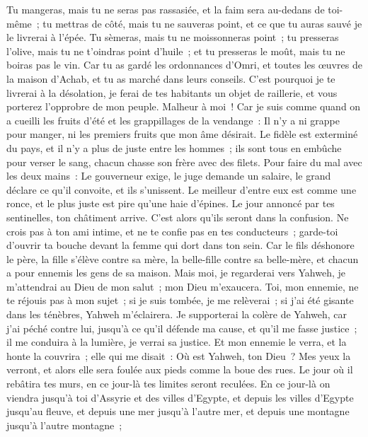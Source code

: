 \begin{multicols}{2}
Tu mangeras, mais tu ne seras pas rassasiée, et la faim sera au-dedans de toi-même~; tu mettras de côté, mais tu ne sauveras point, et ce que tu auras sauvé je le livrerai à l'épée.
Tu sèmeras, mais tu ne moissonneras point~; tu presseras l'olive, mais tu ne t'oindras point d'huile~; et tu presseras le moût, mais tu ne boiras pas le vin.
Car tu as gardé les ordonnances d'Omri, et toutes les œuvres de la maison d'Achab, et tu as marché dans leurs conseils. C'est pourquoi je te livrerai à la désolation, je ferai de tes habitants un objet de raillerie, et vous porterez l'opprobre de mon peuple.
\VerseOne{}Malheur à moi~! Car je suis comme quand on a cueilli les fruits d'été et les grappillages de la vendange~: Il n'y a ni grappe pour manger, ni les premiers fruits que mon âme désirait.
Le fidèle est exterminé du pays, et il n'y a plus de juste entre les hommes~; ils sont tous en embûche pour verser le sang, chacun chasse son frère avec des filets.
Pour faire du mal avec les deux mains~: Le gouverneur exige, le juge demande un salaire, le grand déclare ce qu'il convoite, et ils s'unissent.
Le meilleur d'entre eux est comme une ronce, et le plus juste est pire qu'une haie d'épines. Le jour annoncé par tes sentinelles, ton châtiment arrive. C'est alors qu'ils seront dans la confusion.
Ne crois pas à ton ami intime, et ne te confie pas en tes conducteurs~; garde-toi d'ouvrir ta bouche devant la femme qui dort dans ton sein.
Car le fils déshonore le père, la fille s'élève contre sa mère, la belle-fille contre sa belle-mère, et chacun a pour ennemis les gens de sa maison.
Mais moi, je regarderai vers Yahweh, je m'attendrai au Dieu de mon salut~; mon Dieu m'exaucera.
Toi, mon ennemie, ne te réjouis pas à mon sujet~; si je suis tombée, je me relèverai~; si j'ai été gisante dans les ténèbres, Yahweh m'éclairera.
Je supporterai la colère de Yahweh, car j'ai péché contre lui, jusqu'à ce qu'il défende ma cause, et qu'il me fasse justice~; il me conduira à la lumière, je verrai sa justice.
Et mon ennemie le verra, et la honte la couvrira~; elle qui me disait~: Où est Yahweh, ton Dieu~? Mes yeux la verront, et alors elle sera foulée aux pieds comme la boue des rues.
Le jour où il rebâtira tes murs, en ce jour-là tes limites seront reculées.
En ce jour-là on viendra jusqu'à toi d'Assyrie et des villes d'Egypte, et depuis les villes d'Egypte jusqu'au fleuve, et depuis une mer jusqu'à l'autre mer, et depuis une montagne jusqu'à l'autre montagne~;

\end{multicols}
